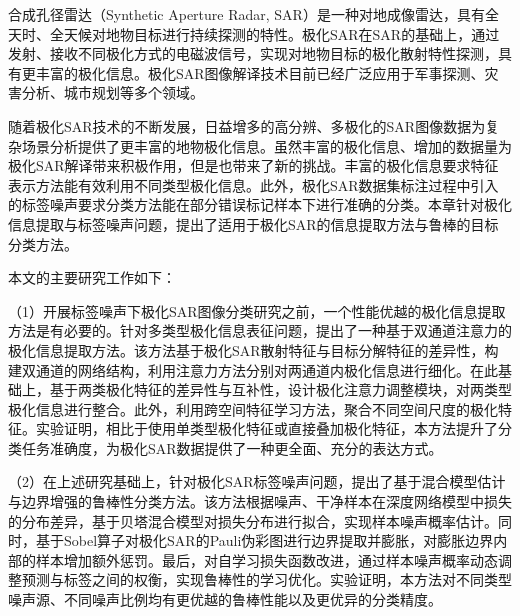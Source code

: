 \begin{chineseabstract}
    合成孔径雷达（Synthetic Aperture Radar, SAR）是一种对地成像雷达，具有全天时、全天候对地物目标进行持续探测的特性。极化SAR在SAR的基础上，通过发射、接收不同极化方式的电磁波信号，实现对地物目标的极化散射特性探测，具有更丰富的极化信息。极化SAR图像解译技术目前已经广泛应用于军事探测、灾害分析、城市规划等多个领域。

    随着极化SAR技术的不断发展，日益增多的高分辨、多极化的SAR图像数据为复杂场景分析提供了更丰富的地物极化信息。虽然丰富的极化信息、增加的数据量为极化SAR解译带来积极作用，但是也带来了新的挑战。丰富的极化信息要求特征表示方法能有效利用不同类型极化信息。此外，极化SAR数据集标注过程中引入的标签噪声要求分类方法能在部分错误标记样本下进行准确的分类。本章针对极化信息提取与标签噪声问题，提出了适用于极化SAR的信息提取方法与鲁棒的目标分类方法。

    本文的主要研究工作如下：

    （1）开展标签噪声下极化SAR图像分类研究之前，一个性能优越的极化信息提取方法是有必要的。针对多类型极化信息表征问题，提出了一种基于双通道注意力的极化信息提取方法。该方法基于极化SAR散射特征与目标分解特征的差异性，构建双通道的网络结构，利用注意力方法分别对两通道内极化信息进行细化。在此基础上，基于两类极化特征的差异性与互补性，设计极化注意力调整模块，对两类型极化信息进行整合。此外，利用跨空间特征学习方法，聚合不同空间尺度的极化特征。实验证明，相比于使用单类型极化特征或直接叠加极化特征，本方法提升了分类任务准确度，为极化SAR数据提供了一种更全面、充分的表达方式。

    （2）在上述研究基础上，针对极化SAR标签噪声问题，提出了基于混合模型估计与边界增强的鲁棒性分类方法。该方法根据噪声、干净样本在深度网络模型中损失的分布差异，基于贝塔混合模型对损失分布进行拟合，实现样本噪声概率估计。同时，基于Sobel算子对极化SAR的Pauli伪彩图进行边界提取并膨胀，对膨胀边界内部的样本增加额外惩罚。最后，对自学习损失函数改进，通过样本噪声概率动态调整预测与标签之间的权衡，实现鲁棒性的学习优化。实验证明，本方法对不同类型噪声源、不同噪声比例均有更优越的鲁棒性能以及更优异的分类精度。



\end{chineseabstract}

